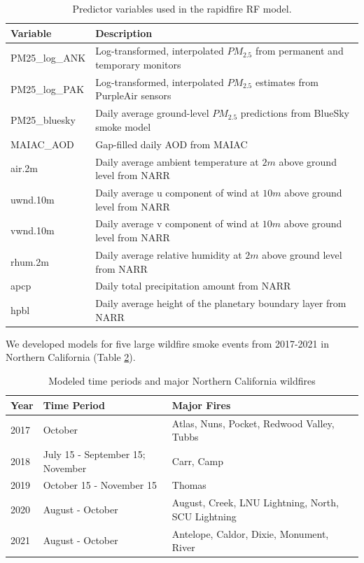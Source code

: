 \documentclass[gmd, manuscript]{copernicus}
\begin{document}
\begin{table}[h]
\caption{Predictor variables used in the rapidfire RF model.}
\begin{tabular}{ll}
Variable       & Description                                                                    \\ \hline
PM25\_log\_ANK & Log-transformed, interpolated $PM_{2.5}$ from permanent and temporary monitors \\
PM25\_log\_PAK & Log-transformed, interpolated $PM_{2.5}$ estimates from PurpleAir sensors      \\
PM25\_bluesky  & Daily average ground-level $PM_{2.5}$ predictions from BlueSky smoke model     \\
MAIAC\_AOD     & Gap-filled  daily AOD from MAIAC                                               \\
air.2m         & Daily average ambient temperature at $2\unit{m}$ above ground level from NARR  \\
uwnd.10m       & Daily average u component of wind at $10\unit{m}$ above ground level from NARR \\
vwnd.10m       & Daily average v component of wind at $10\unit{m}$ above ground level from NARR \\
rhum.2m        & Daily average relative humidity at $2\unit{m}$ above ground level from NARR    \\
apcp           & Daily total precipitation amount from NARR                                     \\
hpbl           & Daily average height of the planetary boundary layer from NARR                
\end{tabular}
\label{table:1}
\end{table}

We developed models for five large wildfire smoke events from 2017-2021
in Northern California (Table \ref{table:2}).

\begin{table}[h]
\caption{Modeled time periods and major Northern California wildfires}
\begin{tabular}{lll}
Year & Time Period              & Major Fires                                        \\ \hline
2017 & October                  & Atlas, Nuns, Pocket, Redwood Valley, Tubbs         \\
2018 & July 15 - September 15; November   & Carr, Camp                               \\
2019 & October 15 - November 15 & Thomas                                             \\
2020 & August - October         & August, Creek, LNU Lightning, North, SCU Lightning \\
2021 & August - October         & Antelope, Caldor, Dixie, Monument, River          
\end{tabular}
\label{table:2}
\end{table}
\end{document}
